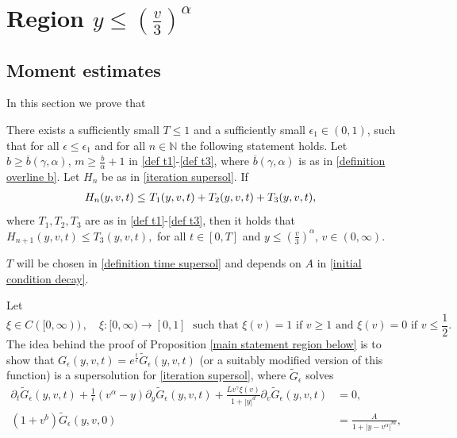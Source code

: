 \documentclass[11pt]{article}
\numberwithin{equation}{section}
\begin{document}
\section{Region $y\leq (\frac{v}{3})^{\alpha}$}\label{section four}
\subsection{Moment estimates}
In this section we prove that 
 \begin{prop}\label{main statement region below}
   There exists a sufficiently small $T\leq 1$ and a sufficiently small $\epsilon_{1}\in(0,1)$, such that for all $\epsilon\leq\epsilon_{1}$ and for all $n\in\mathbb{N}$ the following statement holds. Let $b\geq \overline{b}(\gamma,\alpha)$, $m\geq \frac{b}{\alpha}+1$ in \eqref{def t1}-\eqref{def t3}, where $\overline{b}(\gamma,\alpha)$ is as in \eqref{definition overline b}.  Let $H_{n}$ be as in \eqref{iteration supersol}. If 
     \begin{align*}
     H_{n}(y,v,t)\leq & \textup{ } T_{1}(y,v,t)+ T_{2}(y,v,t)+ T_{3}(y,v,t),
    \end{align*}
 where $T_{1},T_{2},T_{3}$ are as in \eqref{def t1}-\eqref{def t3}, then it holds that  $H_{n+1}(y,v,t)\leq T_{3}(y,v,t),$ for all $t\in[0,T]$ and $y\leq (\frac{v}{3})^{\alpha}$, $v\in(0,\infty)$.
 \end{prop}
 \begin{rmk}
 $T$ will be chosen in \eqref{definition time supersol} and depends on $A$ in \eqref{initial condition decay}.
 \end{rmk}
 Let
\begin{equation}\label{chirdef}
\xi\in C([0,\infty))\,, \quad \xi\colon [0,\infty)\rightarrow [0,1] \; \mbox{ such that } \xi(v)=1
\mbox{ if } v\geq 1 \mbox{ and } \xi(v)=0 \mbox{ if } v\leq \frac{1}{2}.
\end{equation}
The idea behind the proof of Proposition \ref{main statement region below} is to show that $G_{\epsilon}(y,v,t)=e^{\frac{t}{\epsilon}}\tilde{G}_{\epsilon}(y,v,t)$ (or a suitably modified version of this function) is a supersolution  for \eqref{iteration supersol}, where $\tilde{G}_{\epsilon}$ solves
\begin{align*}
\partial_{t}\tilde{G}_{\epsilon}(y,v,t)+\frac{1}{\epsilon}(v^{\alpha}-y)\partial_{y}\tilde{G}_{\epsilon}(y,v,t)+\frac{Lv^{\gamma}\xi(v)}{1+|y|^{d}}\partial_{v}\tilde{G}_{\epsilon}(y,v,t)&=0,\\
(1+v^{b})\tilde{G}_{\epsilon}(y,v,0)&=\frac{A}{1+|y-v^{\alpha}|^{m}},
\end{align*}
\end{document}

